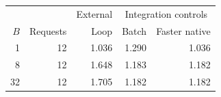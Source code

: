 \begin{tabular}{@{}rrrrr@{}}
\toprule
 & & External & \multicolumn{2}{c}{Integration controls}\\
$B$ & Requests & Loop & Batch & Faster native\\\midrule
1 & 12 & 1.036 & 1.290 & 1.036\\
8 & 12 & 1.648 & 1.183 & 1.182\\
32 & 12 & 1.705 & 1.182 & 1.182\\
\bottomrule
\end{tabular}
